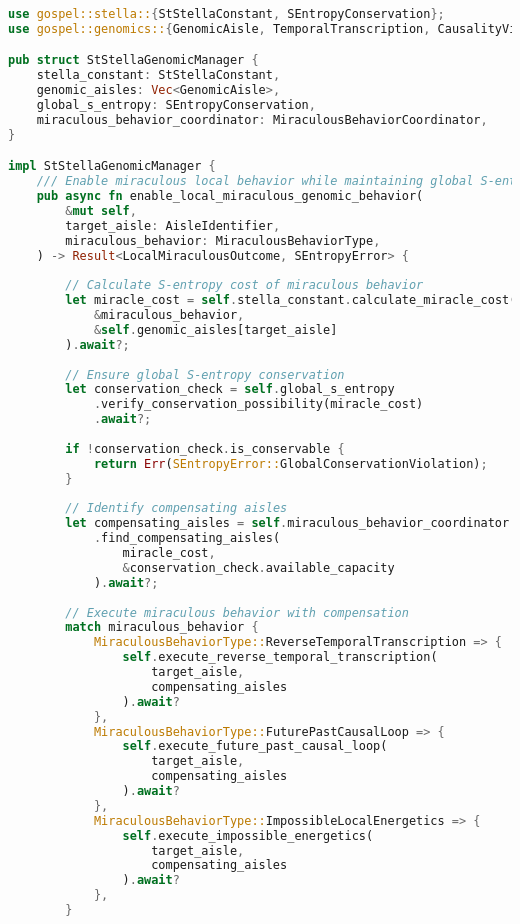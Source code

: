 \documentclass[12pt,a4paper]{article}
\begin{document}
\begin{lstlisting}[language=Rust, caption=St. Stella Constant Genomic Aisle Manager, basicstyle=\footnotesize]
use gospel::stella::{StStellaConstant, SEntropyConservation};
use gospel::genomics::{GenomicAisle, TemporalTranscription, CausalityViolation};

pub struct StStellaGenomicManager {
    stella_constant: StStellaConstant,
    genomic_aisles: Vec<GenomicAisle>,
    global_s_entropy: SEntropyConservation,
    miraculous_behavior_coordinator: MiraculousBehaviorCoordinator,
}

impl StStellaGenomicManager {
    /// Enable miraculous local behavior while maintaining global S-entropy
    pub async fn enable_local_miraculous_genomic_behavior(
        &mut self,
        target_aisle: AisleIdentifier,
        miraculous_behavior: MiraculousBehaviorType,
    ) -> Result<LocalMiraculousOutcome, SEntropyError> {
        
        // Calculate S-entropy cost of miraculous behavior
        let miracle_cost = self.stella_constant.calculate_miracle_cost(
            &miraculous_behavior,
            &self.genomic_aisles[target_aisle]
        ).await?;
        
        // Ensure global S-entropy conservation
        let conservation_check = self.global_s_entropy
            .verify_conservation_possibility(miracle_cost)
            .await?;
        
        if !conservation_check.is_conservable {
            return Err(SEntropyError::GlobalConservationViolation);
        }
        
        // Identify compensating aisles
        let compensating_aisles = self.miraculous_behavior_coordinator
            .find_compensating_aisles(
                miracle_cost,
                &conservation_check.available_capacity
            ).await?;
        
        // Execute miraculous behavior with compensation
        match miraculous_behavior {
            MiraculousBehaviorType::ReverseTemporalTranscription => {
                self.execute_reverse_temporal_transcription(
                    target_aisle,
                    compensating_aisles
                ).await?
            },
            MiraculousBehaviorType::FuturePastCausalLoop => {
                self.execute_future_past_causal_loop(
                    target_aisle,
                    compensating_aisles
                ).await?
            },
            MiraculousBehaviorType::ImpossibleLocalEnergetics => {
                self.execute_impossible_energetics(
                    target_aisle,
                    compensating_aisles
                ).await?
            },
        }
        

\end{lstlisting}
\end{document}
